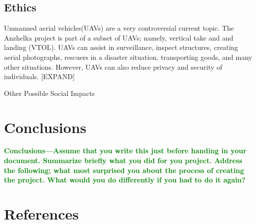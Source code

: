\documentclass{article}
\numberwithin{equation}{section} %
\begin{document}
\subsection{Ethics}

Unmanned aerial vehicles(UAVs) are a very controversial current topic. The Anzhelka project is part of a subset of UAVs; namely, vertical take and and landing (VTOL). UAVs can assist in surveillance, inspect structures, creating aerial photographs, rescuers in a disaster situation, transporting goods, and many other situations. However, UAVs can also reduce privacy and security of individuals. [EXPAND]



Other Possible Social Impacts

\section{Conclusions}
\textcolor{green}{\bf Conclusions—Assume that you write this just before handing in your document. 
Summarize brieﬂy what you did for you project. Address the following; what most 
surprised you about the process of creating the project. What would you do 
differently if you had to do it again?}

\section{References}
\end{document}
